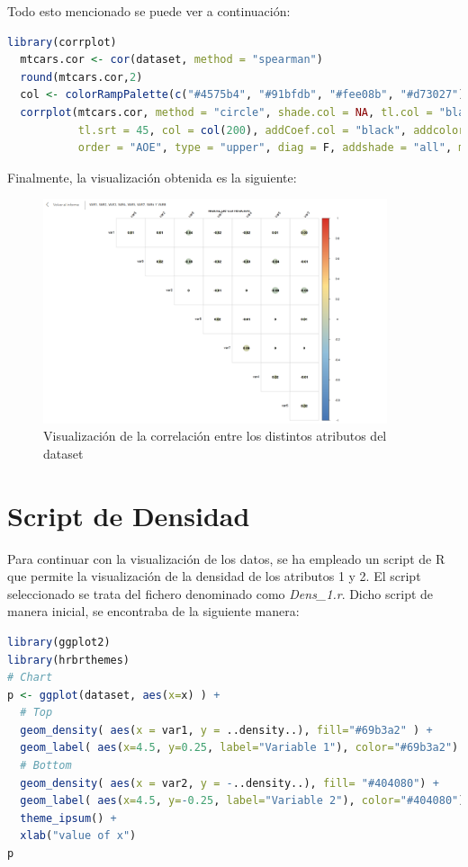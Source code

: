 \documentclass[11pt]{report}
\begin{document}
Todo esto mencionado se puede ver a continuación:

\begin{lstlisting}[language=R, breaklines=true, basicstyle=\small\ttfamily]
  library(corrplot)
  mtcars.cor <- cor(dataset, method = "spearman")
  round(mtcars.cor,2)
  col <- colorRampPalette(c("#4575b4", "#91bfdb", "#fee08b", "#d73027"))				 
  corrplot(mtcars.cor, method = "circle", shade.col = NA, tl.col = "black",
           tl.srt = 45, col = col(200), addCoef.col = "black", addcolorlabel = "no",
           order = "AOE", type = "upper", diag = F, addshade = "all", main = "Matriz de correlación", xlab = "Variables", ylab = "Variables")	
\end{lstlisting}

Finalmente, la visualización obtenida es la siguiente:

\begin{figure}[H]
	\centering
	\includegraphics[width=0.9\textwidth]{./img/Correlation-Image.png}
	\caption{Visualización de la correlación entre los distintos atributos del dataset}
	\label{fig:correlation}
\end{figure}

\section{Script de Densidad}

Para continuar con la visualización de los datos, se ha empleado un script de R que permite la visualización de la densidad de los atributos 1 y 2. El script seleccionado se trata del fichero denominado como \emph{Dens\_1.r}. Dicho script de manera inicial, se encontraba de la siguiente manera:

\begin{lstlisting}[language=R, breaklines=true, basicstyle=\small\ttfamily]
library(ggplot2)
library(hrbrthemes)
# Chart
p <- ggplot(dataset, aes(x=x) ) +
  # Top
  geom_density( aes(x = var1, y = ..density..), fill="#69b3a2" ) +
  geom_label( aes(x=4.5, y=0.25, label="Variable 1"), color="#69b3a2") +
  # Bottom
  geom_density( aes(x = var2, y = -..density..), fill= "#404080") +
  geom_label( aes(x=4.5, y=-0.25, label="Variable 2"), color="#404080") +
  theme_ipsum() +
  xlab("value of x")
p
\end{lstlisting}
\end{document}
